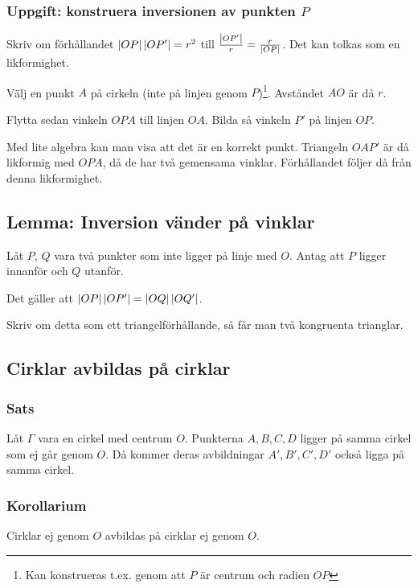 \documentclass[10pt,a4paper]{article}
\begin{document}
\subsubsection{Uppgift: konstruera inversionen av punkten $P$}
Skriv om förhållandet $\left|OP\right| \left|OP'\right| = r^2$ till $\frac{\left|OP'\right|}{r} = \frac{r}{\left|OP\right|}$. Det kan tolkas som en likformighet.

Välj en punkt $A$ på cirkeln (inte på linjen genom $P$)\footnote{Kan konstrueras t.ex. genom att $P$ är centrum och radien $OP$}. Avståndet $AO$ är då $r$. 

Flytta sedan vinkeln $OPA$ till linjen $OA$. Bilda så vinkeln $P'$ på linjen $OP$.

Med lite algebra kan man visa att det är en korrekt punkt. Triangeln $OAP'$ är då likformig med $OPA$, då de har två gemensama vinklar. Förhållandet följer då från denna likformighet.

\subsection{Lemma: Inversion vänder på vinklar}
Låt $P$, $Q$ vara två punkter som inte ligger på linje med $O$. Antag att $P$ ligger innanför och $Q$ utanför. 

Det gäller att $\left|OP\right|\left|OP'\right| = \left|OQ\right| \left|OQ'\right|$.

Skriv om detta som ett triangelförhållande, så får man två kongruenta trianglar.

\subsection{Cirklar avbildas på cirklar}

\subsubsection{Sats}
Låt $\Gamma$ vara en cirkel med centrum $O$. Punkterna $A,B,C,D$ ligger på samma cirkel som ej går genom $O$. Då kommer deras avbildningar $A',B',C',D'$ också ligga på samma cirkel.


\subsubsection{Korollarium}
Cirklar ej genom $O$ avbildas på cirklar ej genom $O$.
\end{document}
